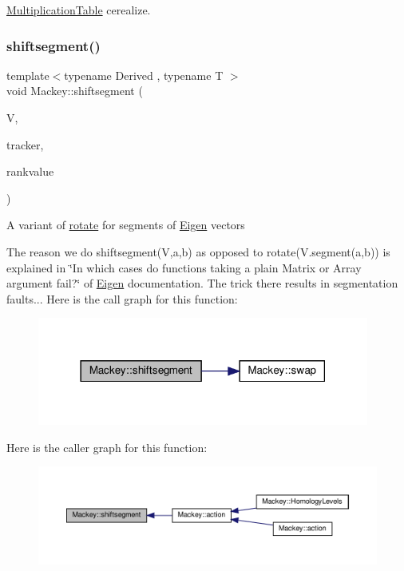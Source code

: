 \hyperlink{classMackey_1_1MultiplicationTable}{Multiplication\+Table} cerealize. 

\mbox{\label{namespaceMackey_aab8a6292210a3b71960cb03b79d218e6}} 
\subsubsection{\texorpdfstring{shiftsegment()}{shiftsegment()}}
{\footnotesize\ttfamily template$<$typename Derived , typename T $>$ \\
void Mackey\+::shiftsegment (\begin{DoxyParamCaption}\item[{Eigen\+::\+Matrix\+Base$<$ Derived $>$ \&}]{V,  }\item[{int}]{tracker,  }\item[{T}]{rankvalue }\end{DoxyParamCaption})}

A variant of \hyperlink{namespaceMackey_a38a833de54971845cbdb8c96f830725b}{rotate} for segments of \hyperlink{namespaceEigen}{Eigen} vectors

The reason we do shiftsegment(\+V,a,b) as opposed to rotate(V.\+segment(a,b)) is explained in \char`\"{}\+In which cases do functions taking a plain Matrix or Array argument fail?\char`\"{} of \hyperlink{namespaceEigen}{Eigen} documentation. The trick there results in segmentation faults... Here is the call graph for this function\+:\nopagebreak
\begin{figure}[H]
\begin{center}
\leavevmode
\includegraphics[width=309pt]{namespaceMackey_aab8a6292210a3b71960cb03b79d218e6_cgraph}
\end{center}
\end{figure}
Here is the caller graph for this function\+:\nopagebreak
\begin{figure}[H]
\begin{center}
\leavevmode
\includegraphics[width=350pt]{namespaceMackey_aab8a6292210a3b71960cb03b79d218e6_icgraph}
\end{center}
\end{figure}
\mbox{\label{namespaceMackey_a425b988266cedec0299fb539d99179b1}} 
